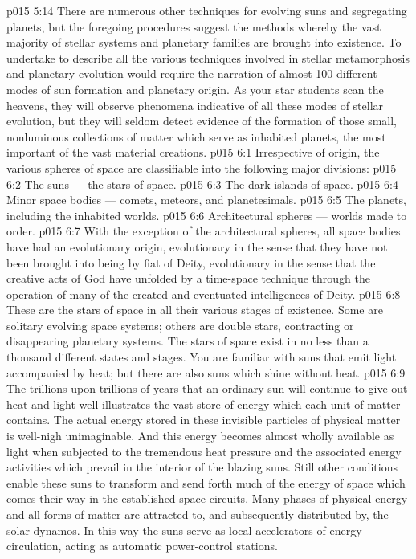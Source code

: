\vs p015 5:14 \pc There are numerous other techniques for evolving suns and segregating planets, but the foregoing procedures suggest the methods whereby the vast majority of stellar systems and planetary families are brought into existence. To undertake to describe all the various techniques involved in stellar metamorphosis and planetary evolution would require the narration of almost 100 different modes of sun formation and planetary origin. As your star students scan the heavens, they will observe phenomena indicative of all these modes of stellar evolution, but they will seldom detect evidence of the formation of those small, nonluminous collections of matter which serve as inhabited planets, the most important of the vast material creations.
\vs p015 6:1 Irrespective of origin, the various spheres of space are classifiable into the following major divisions:
\vs p015 6:2 \bibnobreakspace The suns --- the stars of space.
\vs p015 6:3 \bibnobreakspace The dark islands of space.
\vs p015 6:4 \bibnobreakspace Minor space bodies --- comets, meteors, and planetesimals.
\vs p015 6:5 \bibnobreakspace The planets, including the inhabited worlds.
\vs p015 6:6 \bibnobreakspace Architectural spheres --- worlds made to order.
\vs p015 6:7 \pc With the exception of the architectural spheres, all space bodies have had an evolutionary origin, evolutionary in the sense that they have not been brought into being by fiat of Deity, evolutionary in the sense that the creative acts of God have unfolded by a time\hyp{}space technique through the operation of many of the created and eventuated intelligences of Deity.
\vs p015 6:8 \pc {} These are the stars of space in all their various stages of existence. Some are solitary evolving space systems; others are double stars, contracting or disappearing planetary systems. The stars of space exist in no less than a thousand different states and stages. You are familiar with suns that emit light accompanied by heat; but there are also suns which shine without heat.
\vs p015 6:9 The trillions upon trillions of years that an ordinary sun will continue to give out heat and light well illustrates the vast store of energy which each unit of matter contains. The actual energy stored in these invisible particles of physical matter is well\hyp{}nigh unimaginable. And this energy becomes almost wholly available as light when subjected to the tremendous heat pressure and the associated energy activities which prevail in the interior of the blazing suns. Still other conditions enable these suns to transform and send forth much of the energy of space which comes their way in the established space circuits. Many phases of physical energy and all forms of matter are attracted to, and subsequently distributed by, the solar dynamos. In this way the suns serve as local accelerators of energy circulation, acting as automatic power\hyp{}control stations.

